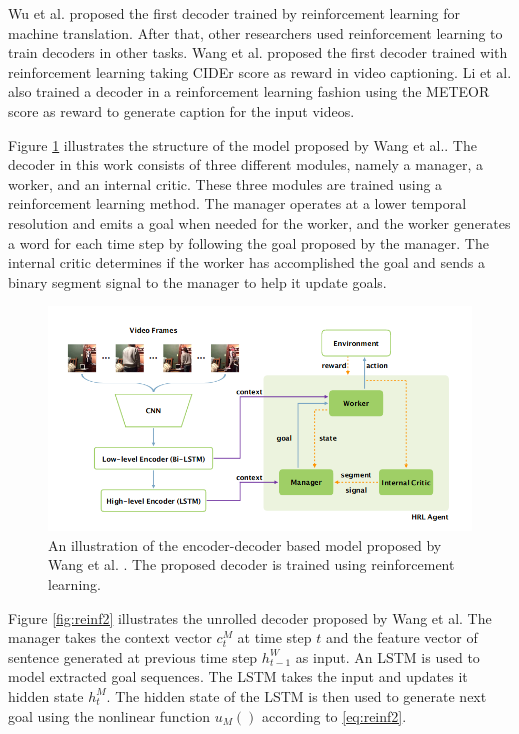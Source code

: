 \documentclass[preprint, 12pt]{elsarticle}
\begin{document}
		Wu et al. \cite{wu2016google} proposed the first decoder trained by reinforcement learning for machine translation. After that, other researchers used reinforcement learning to train decoders in other tasks. Wang et al. \cite{wang2018video} proposed the first decoder trained with reinforcement learning taking CIDEr\cite{vedantam2015cider} score as reward in video captioning. Li et al. \cite{li2018jointly} also trained a decoder in a reinforcement learning fashion using the METEOR \cite{banerjee2005meteor} score as reward to generate caption for the input videos. 
		
		Figure \ref{fig:reinf1} illustrates the structure of the model proposed by Wang et al.\cite{wang2018video}. The decoder in this work consists of three different modules, namely a manager, a worker, and an internal critic. These three modules are trained using a reinforcement learning method. The manager operates at a lower temporal resolution and emits a goal when needed for the worker, and the worker generates a word for each time step by following the goal proposed by the manager. The internal critic determines if the worker has accomplished the goal and sends a binary segment signal to the manager to help it update goals. 
		
		\begin{figure}[H]
			\centering
			\includegraphics[scale=0.5]{Imgs/reinf1.png}
			\caption{An illustration of the encoder-decoder based model proposed by Wang et al. \cite{wang2018video}. The proposed decoder is trained using reinforcement learning.}
			\label{fig:reinf1}
		\end{figure}
	
		Figure \ref{fig:reinf2} illustrates the unrolled decoder proposed by Wang et al. The manager takes the context vector $c_t^M$ at time step $t$ and the feature vector of sentence generated at previous time step $h_{t-1}^W$ as input. An LSTM is used to model extracted goal sequences. The LSTM takes the input and updates it hidden state $h_t^M$. The hidden state of the LSTM is then used to generate next goal using the nonlinear function $u_M()$ according to \eqref{eq:reinf2}.
		
\end{document}
